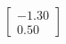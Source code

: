 \documentclass[preview]{standalone}
\begin{document}
\begin{align*}
\begin{bmatrix} -1.30 \\ 0.50 \end{bmatrix}
\end{align*}
\end{document}
